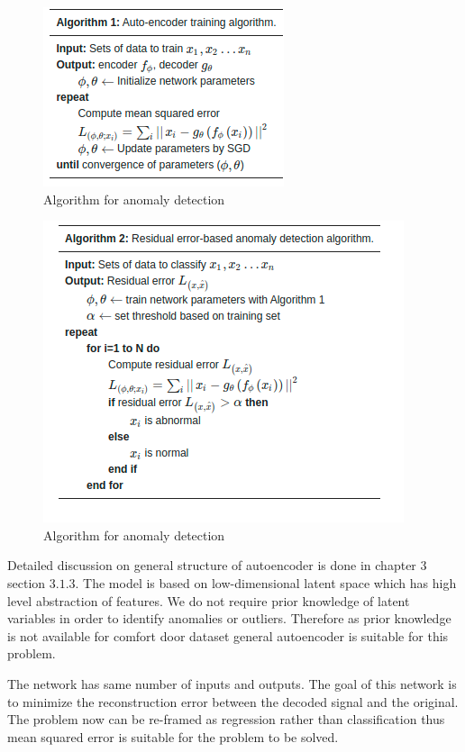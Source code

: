     \begin{figure}[h]
    	\centering
    	\includegraphics[width=0.5\linewidth]{images/algau.png}
    	\caption{Algorithm for anomaly detection \cite{oh2018residual} }
    	\label{nv0}
    \end{figure}
    
     \begin{figure}[h]
     	\centering
     	\includegraphics[width=0.75\linewidth]{images/rsd.png}
     	\caption{Algorithm for anomaly detection \cite{oh2018residual} }
     	\label{n00}
     \end{figure}
   
   Detailed discussion on general structure of autoencoder is done in chapter 3 section $3.1.3$. The model is based on low-dimensional latent space which has high level abstraction of features. We do not require prior knowledge of latent variables in order to identify anomalies or outliers. Therefore as prior knowledge is not available for comfort door dataset general autoencoder is suitable for this problem.
   
   The network has same number of inputs and outputs. The goal of this network is to minimize the reconstruction error between the decoded signal and the original. The problem now can be re-framed as regression rather than classification thus mean squared error is suitable for the problem to be solved.     
   
